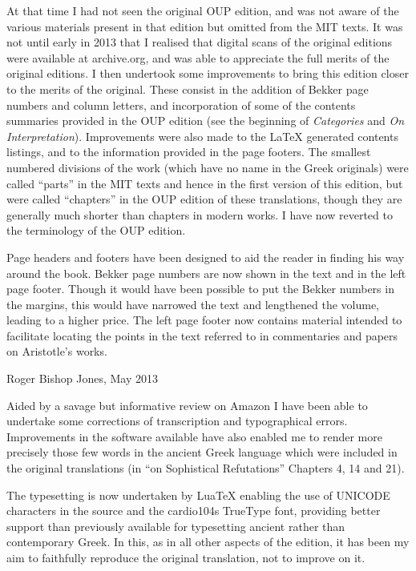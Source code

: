 At that time I had not seen the original OUP edition, and was not aware of the various materials present in that edition but omitted from the MIT texts.
It was not until early in 2013 that I realised that digital scans of the original editions were available at archive.org, and was able to appreciate the full merits of the original editions.
I then undertook some improvements to bring this edition closer to the merits of the original.
These consist in the addition of Bekker page numbers and column letters, and incorporation of some of the contents summaries provided in the OUP edition (see the beginning of \emph{Categories} and \emph{On Interpretation}).
Improvements were also made to the {\LaTeX} generated contents listings, and to the information provided in the page footers.
The smallest numbered divisions of the work (which have no name in the Greek originals) were called ``parts'' in the MIT texts and hence in the first version of this edition, but were called ``chapters'' in the OUP edition of these translations, though they are generally much shorter than chapters in modern works.
I have now reverted to the terminology of the OUP edition.

Page headers and footers have been designed to aid the reader in finding his way around the book.
Bekker page numbers are now shown in the text and in the left page footer.
Though it would have been possible to put the Bekker numbers in the margins, this would have narrowed the text and lengthened the volume, leading to a higher price.
The left page footer now contains material intended to facilitate locating the points in the text referred to in commentaries and papers on Aristotle's works.

\vspace{0.15in}

Roger Bishop Jones,
May 2013


\vspace{0.15in}


Aided by a savage but informative review on Amazon I have been able to undertake some corrections of transcription and typographical errors.
Improvements in the software available have also enabled me to render more precisely those few words in the ancient Greek language which were included in the original translations (in ``on Sophistical Refutations'' Chapters 4, 14 and 21).

The typesetting is now undertaken by Lua\TeX{} enabling the use of UNICODE characters in the source and the cardio104s TrueType font, providing better support than previously available for typesetting ancient rather than contemporary Greek.
In this, as in all other aspects of the edition, it has been my aim to faithfully reproduce the original translation, not to improve on it.

